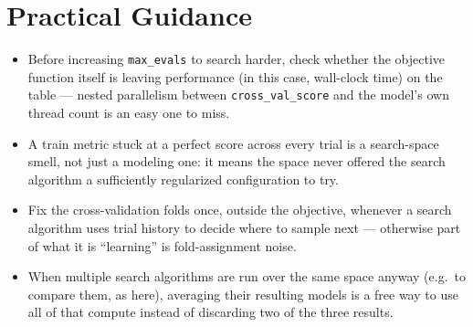 \documentclass[conference]{IEEEtran}
\begin{document}
\section*{Practical Guidance}
\begin{itemize}
    \item Before increasing \texttt{max\_evals} to search harder, check whether the objective function itself is leaving performance (in this case, wall-clock time) on the table --- nested parallelism between \texttt{cross\_val\_score} and the model's own thread count is an easy one to miss.
    \item A train metric stuck at a perfect score across every trial is a search-space smell, not just a modeling one: it means the space never offered the search algorithm a sufficiently regularized configuration to try.
    \item Fix the cross-validation folds once, outside the objective, whenever a search algorithm uses trial history to decide where to sample next --- otherwise part of what it is ``learning'' is fold-assignment noise.
    \item When multiple search algorithms are run over the same space anyway (e.g.\ to compare them, as here), averaging their resulting models is a free way to use all of that compute instead of discarding two of the three results.
\end{itemize}
\end{document}
